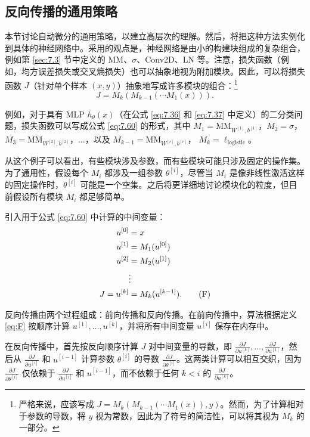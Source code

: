 \subsection{反向传播的通用策略}\label{sec:7.4.2}

本节讨论自动微分的通用策略，以建立高层次的理解。然后，将把这种方法实例化到具体的神经网络中。采用的观点是，神经网络是由小的构建块组成的复杂组合，例如第 \ref{sec:7.3} 节中定义的 MM、$\sigma$、Conv2D、LN 等。注意，损失函数（例如，均方误差损失或交叉熵损失）也可以抽象地视为附加模块。因此，可以将损失函数 $J$（针对单个样本 $(x, y)$）抽象地写成许多模块的组合：\footnote{严格来说，应该写成 $J = M_k(M_{k-1}(\cdots M_1(x)), y)$。然而，为了计算相对于参数的导数，将 $y$ 视为常数，因此为了符号的简洁性，可以将其视为 $M_k$ 的一部分。}
\begin{equation}
    J = M_k(M_{k-1}(\cdots M_1(x))). \label{eq:7.60}
\end{equation}

例如，对于具有 MLP $\bar{h}_\theta(x)$（在公式 \eqref{eq:7.36} 和 \eqref{eq:7.37} 中定义）的二分类问题，损失函数可以写成公式 \eqref{eq:7.60} 的形式，其中 $M_1 = \text{MM}_{W^{[1]}, b^{[1]}}$，$M_2 = \sigma$， $M_3 = \text{MM}_{W^{[2]}, b^{[2]}}$，$\dots$，以及 $M_{k-1} = \text{MM}_{W^{[r]}, b^{[r]}}$， $M_k = \ell_{\text{logistic}}$。

从这个例子可以看出，有些模块涉及参数，而有些模块可能只涉及固定的操作集。为了通用性，假设每个 $M_i$ 都涉及一组参数 $\theta^{[i]}$，尽管当 $M_i$ 是像非线性激活这样的固定操作时，$\theta^{[i]}$ 可能是一个空集。之后将更详细地讨论模块化的粒度，但目前假设所有模块 $M_i$ 都足够简单。

引入用于公式 \eqref{eq:7.60} 中计算的中间变量：
\begin{align}
    u^{[0]} &= x \notag\\
    u^{[1]} &= M_1(u^{[0]}) \notag\\
    u^{[2]} &= M_2(u^{[1]}) \notag\\
    &\vdots \notag\\
    J = u^{[k]} &= M_k(u^{[k-1]}). \tag{F}\label{eq:F}
\end{align}

反向传播由两个过程组成：前向传播和反向传播。在前向传播中，算法根据定义 \eqref{eq:F} 按顺序计算 $u^{[1]}, \dots, u^{[k]}$，并将所有中间变量 $u^{[i]}$ 保存在内存中。

在反向传播中，首先按反向顺序计算 $J$ 对中间变量的导数，即 $\frac{\partial J}{\partial u^{[k]}}, \dots, \frac{\partial J}{\partial u^{[1]}}$，然后从 $\frac{\partial J}{\partial u^{[i]}}$ 和 $u^{[i-1]}$ 计算参数 $\theta^{[i]}$ 的导数 $\frac{\partial J}{\partial \theta^{[i]}}$。这两类计算可以相互交织，因为 $\frac{\partial J}{\partial \theta^{[i]}}$ 仅依赖于 $\frac{\partial J}{\partial u^{[i]}}$ 和 $u^{[i-1]}$，而不依赖于任何 $k < i$ 的 $\frac{\partial J}{\partial u^{[k]}}$。

